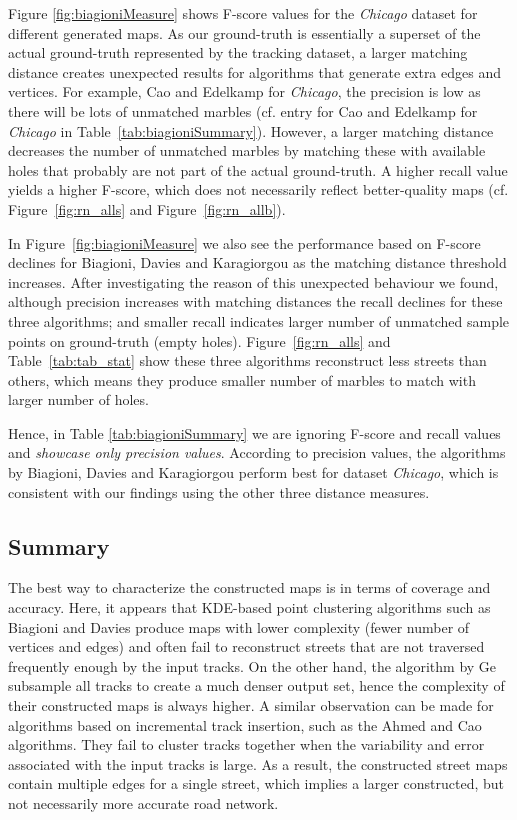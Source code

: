 \documentclass[natbib]{svjour3}                    \smartqed  \usepackage[table]{xcolor}
\begin{document}
Figure \ref{fig:biagioniMeasure} shows F-score values for the \emph{Chicago} dataset for different generated maps. As our ground-truth is essentially a superset of the actual ground-truth represented by the tracking dataset, a larger matching distance creates unexpected results for algorithms that generate extra edges and vertices. For example, Cao and Edelkamp for \emph{Chicago}, the precision is low as there will be lots of unmatched marbles (cf. entry for Cao and Edelkamp for \emph{Chicago} in Table~\ref{tab:biagioniSummary}). However, a larger matching distance decreases the number of unmatched marbles by matching these with available holes that probably are not part of the actual ground-truth. A higher recall value yields a higher F-score, which does not necessarily reflect better-quality maps (cf. Figure~\ref{fig:rn_alls} and Figure~\ref{fig:rn_allb}).

In Figure~\ref{fig:biagioniMeasure} we also see the performance based on F-score declines for Biagioni, Davies and Karagiorgou as the matching distance threshold increases. After investigating the reason of this unexpected behaviour we found, although precision increases with matching distances the recall declines for these three algorithms; and smaller recall indicates larger number of unmatched sample points on ground-truth (empty holes). Figure~\ref{fig:rn_alls} and Table~\ref{tab:tab_stat} show these three algorithms reconstruct less streets than others, which means they produce smaller number of marbles to match with larger number of holes.
 
Hence, in Table \ref{tab:biagioniSummary} we are ignoring F-score and recall values and \emph{showcase only precision values}. According to precision values, the algorithms by Biagioni, Davies and Karagiorgou perform best for dataset \emph{Chicago}, which is consistent with our findings using the other three distance measures.

\subsection{Summary} 
\label{sub:summary}

The best way to characterize the constructed maps is in terms of coverage and accuracy. 
Here, it appears that KDE-based point clustering algorithms such as Biagioni and Davies produce maps with lower complexity (fewer number of vertices and edges) and often fail to reconstruct streets that are not traversed frequently enough by the input tracks. 
On the other hand, the algorithm by Ge subsample all tracks to create a much denser output set, hence the complexity of their constructed maps is always higher. 
A similar observation can be made for algorithms based on incremental track insertion, such as the Ahmed and Cao algorithms. They fail to cluster tracks together when the variability and error associated with the input tracks is large. As a result, the constructed street maps contain multiple edges for a single street, which implies a larger constructed, but not necessarily more accurate road network.
\end{document}
